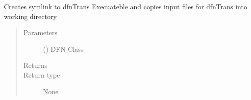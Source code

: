 \documentclass[letterpaper,10pt,english]{sphinxmanual}
\begin{document}
\begin{fulllineitems}
\label{\detokenize{pydfnworks:pydfnworks.dfnTrans.transport.copy_dfn_trans_files}}
Creates symlink to dfnTrans Execuateble and copies input files for dfnTrans into working directory
\begin{quote}\begin{description}
\item[{Parameters}] \leavevmode
{} () \textendash{} DFN Class

\item[{Returns}] \leavevmode


\item[{Return type}] \leavevmode
None

\end{description}\end{quote}

\end{fulllineitems}

\end{document}
